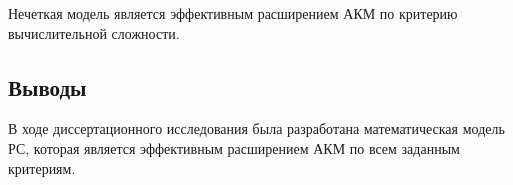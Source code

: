 \begin{assert}
	\label{ass:eff-calc}
	Нечеткая модель является эффективным расширением АКМ
	по критерию вычислительной сложности.
\end{assert}

\subsection{Выводы}
В ходе диссертационного исследования была разработана
математическая модель РС, которая является эффективным
расширением АКМ по всем заданным критериям.
%
%
%
